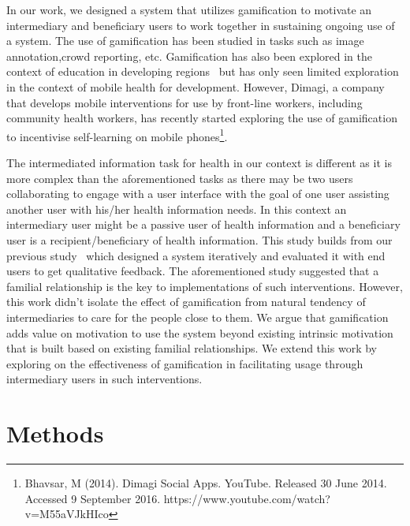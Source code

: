 \documentclass{sig-alternate}
\begin{document}
In our work, we designed a system that  utilizes gamification to motivate an intermediary and beneficiary users to work together in sustaining ongoing use of a system. The use of gamification has been studied in tasks such as image annotation\cite{mekler2013:disassembling},crowd reporting\cite{crowley2012:gamification}, etc. Gamification has also been explored in the context of education in developing regions~\cite{kam2008designing,botha2015icts} but has only seen limited exploration in the context of mobile health for development.  However, Dimagi, a company that develops mobile interventions for use by front-line workers, including community health workers, has recently started exploring the use of gamification to incentivise self-learning on mobile phones\footnote{Bhavsar, M (2014). Dimagi Social Apps. YouTube. Released 30 June 2014. Accessed 9 September 2016. https://www.youtube.com/watch?v=M55aVJkHIco}.

The intermediated information task for health in our context is different as it is more complex than the aforementioned tasks as there may be two users collaborating to engage with a user interface with the goal of one user assisting another user with his/her health information needs. In this context an intermediary  user might be a passive user of health information and a beneficiary user is a recipient/beneficiary of health information. This study builds from our previous study~\cite{katule2016:leveraging} which designed a system iteratively and evaluated it with end users to get qualitative feedback. The aforementioned study suggested that a familial relationship is the key to implementations of such interventions. However, this work didn't isolate the effect of gamification from natural tendency of intermediaries to care for the people close to them. We argue that gamification adds value on motivation to use the system beyond existing intrinsic motivation that is built based on existing familial relationships. We extend this work by exploring on the effectiveness of gamification in facilitating usage through intermediary users in such interventions.
\section{Methods}
\end{document}

